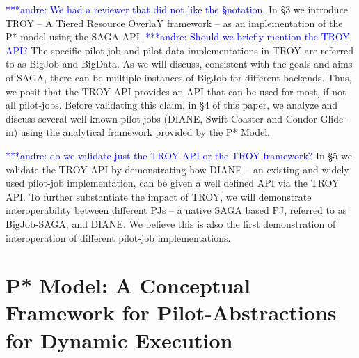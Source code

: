 \documentclass[conference,final]{IEEEtran}
\newcommand{\jhanote}[1]{ {\textcolor{red} { ***shantenu: #1 }}}
\newcommand{\alnote}[1]{ {\textcolor{blue} { ***andre: #1 }}}
\newcommand{\alnote}[1]{}
\newcommand{\jhanote}[1]{}
\newcommand{\upp}{\vspace*{-0.5em}}
\begin{document}
\alnote{We had a reviewer that did not like the \S notation.}
In \S3 we introduce TROY -- A Tiered Resource OverlaY framework -- as
an implementation of the P* model using the SAGA API. \alnote{Should we briefly mention the TROY API?} The specific
pilot-job and pilot-data implementations in TROY are referred to as
BigJob and BigData. As we will discuss, consistent with the goals and
aims of SAGA, there can be multiple %
instances of BigJob for different backends.  Thus, we posit that the
TROY API provides an API that can be used for most, if not all
pilot-jobs. Before validating this claim, in \S4 of this paper, we
analyze and discuss several well-known pilot-jobs (DIANE,
Swift-Coaster and Condor Glide-in) using the analytical framework
provided by the P* Model.


\alnote{do we validate just the TROY API or the TROY framework?}
In \S5 we validate the TROY API by demonstrating how DIANE -- an existing and
widely used pilot-job implementation, can be given a well defined API via the
TROY API. To further substantiate the impact of TROY, we will demonstrate
interoperability between different PJs -- a native SAGA based PJ, referred to as
BigJob-SAGA, and DIANE. We believe this is also the first demonstration of
interoperation of different pilot-job implementations.





\section{P* Model: A Conceptual Framework for Pilot-Abstractions for
  Dynamic Execution \upp\upp}
\label{sec:pilot-model}
\end{document}
